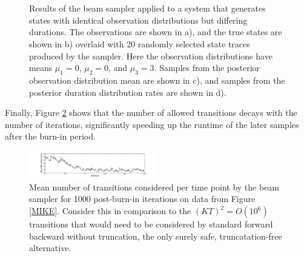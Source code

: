 \begin{figure}
     \\
     \\
    \caption{Results of the beam sampler applied to a system that generates states with identical observation distributions but differing durations. The observations are shown in a), and the true states are shown in b) overlaid with 20 randomly selected state traces produced by the sampler. Here the observation distributions have means $\mu_1 = 0$, $\mu_2 = 0$, and $\mu_3 = 3$. Samples from the posterior observation distribution mean are shown in c), and samples from the posterior duration distribution rates are shown in d).}
    \label{fig:experiment2_results}
\end{figure}



Finally, Figure \ref{fig:allowed} shows that the number of allowed transitions decays with the number of iterations, significantly speeding up the runtime of the later samples after the burn-in period. 


\begin{figure}
    \includegraphics[width=0.5\textwidth]{../pic/number_transitions_visited.pdf}

\caption{Mean number of transitions considered per time point by the beam sampler for 1000 post-burn-in iterations on data from Figure \ref{MIKE}. Consider this in comparison to the $(KT)^2 = O(10^6)$ transitions that would need to be considered by standard forward backward without truncation, the only surely safe, truncatation-free alternative.}
\label{fig:allowed}
\end{figure}
